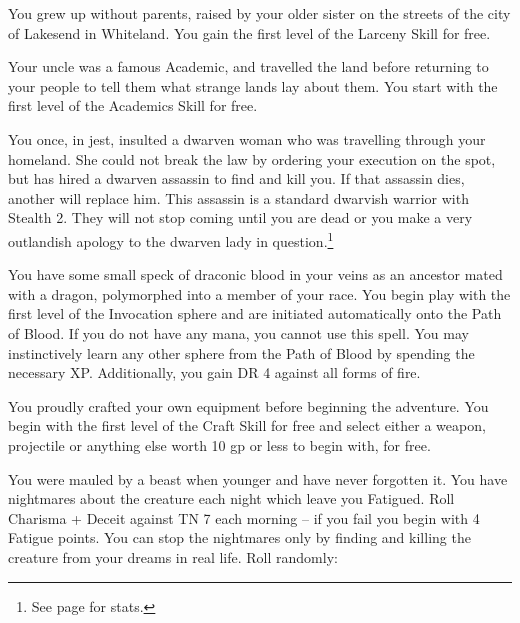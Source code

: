 \begin{multicols}{2}
\begin{list}{\addtocounter{list}{1}\textbf{:}}{\raggedleft}
\item{You grew up without parents, raised by your older sister on the streets of the city of Lakesend in Whiteland.  You gain the first level of the Larceny Skill for free.}

\item{Your uncle was a famous Academic, and travelled the land before returning to your people to tell them what strange lands lay about them.  You start with the first level of the Academics Skill for free.}

\item{You once, in jest, insulted a dwarven woman who was travelling through your homeland.  She could not break the law by ordering your execution on the spot, but has hired a dwarven assassin to find and kill you.  If that assassin dies, another will replace him.  This assassin is a standard dwarvish warrior with Stealth 2.  They will not stop coming until you are dead or you make a very outlandish apology to the dwarven lady in question.\footnote{See page \pageref{dwarven_soldier} for stats.}}

\item{You have some small speck of draconic blood in your veins as an ancestor mated with a dragon, polymorphed into a member of your race.  You begin play with the first level of the Invocation sphere and are initiated automatically onto the Path of Blood.  If you do not have any mana, you cannot use this spell.  You may instinctively learn any other sphere from the Path of Blood by spending the necessary XP.  Additionally, you gain DR 4 against all forms of fire.}

\item{You proudly crafted your own equipment before beginning the adventure.  You begin with the first level of the Craft Skill for free and select either a weapon, projectile or anything else worth 10 gp or less to begin with, for free.}

\item{You were mauled by a beast when younger and have never forgotten it. You have nightmares about the creature each night which leave you Fatigued.  Roll Charisma + Deceit against TN 7 each morning -- if you fail you begin with 4 Fatigue points.  You can stop the nightmares only by finding and killing the creature from your dreams in real life.  Roll randomly:}

	\setcounter{enc}{6}

	\begin{list}{\addtocounter{enc}{-1}}{}


\end{list}
\end{list}
\end{multicols}
